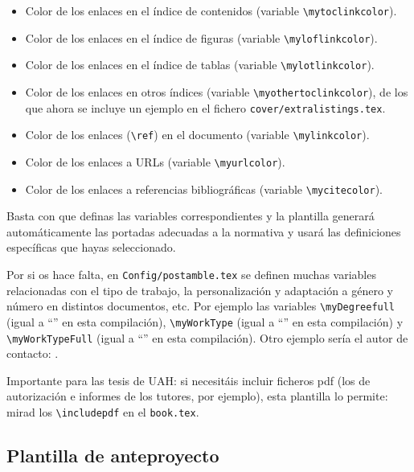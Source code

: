 \begin{itemize}
\item Color de los enlaces en el índice de contenidos (variable
  \texttt{\textbackslash{}mytoclinkcolor}).
\item Color de los enlaces en el índice de figuras (variable
  \texttt{\textbackslash{}myloflinkcolor}).
\item Color de los enlaces en el índice de tablas (variable
  \texttt{\textbackslash{}mylotlinkcolor}).
\item Color de los enlaces en otros índices (variable
  \texttt{\textbackslash{}myothertoclinkcolor}), de los que ahora se
  incluye un ejemplo en el fichero \texttt{cover/extralistings.tex}.
\item Color de los enlaces (\texttt{\textbackslash{}ref}) en el
  documento (variable \texttt{\textbackslash{}mylinkcolor}).
\item Color de los enlaces a URLs (variable
  \texttt{\textbackslash{}myurlcolor}).
\item Color de los enlaces a referencias bibliográficas (variable
  \texttt{\textbackslash{}mycitecolor}).
\end{itemize}

Basta con que definas las variables correspondientes y la plantilla
generará automáticamente las portadas adecuadas a la normativa y usará
las definiciones específicas que hayas seleccionado.

Por si os hace falta, en \texttt{Config/postamble.tex} se definen
muchas variables relacionadas con el tipo de trabajo, la
personalización y adaptación a género y número en distintos
documentos, etc. Por ejemplo las variables
\texttt{\textbackslash{}myDegreefull} (igual a ``\myDegreefull'' en
esta compilación), \texttt{\textbackslash{}myWorkType} (igual a
``\myWorkType'' en esta compilación) y
\texttt{\textbackslash{}myWorkTypeFull} (igual a ``\myWorkTypeFull''
en esta compilación). Otro ejemplo sería el autor de contacto:
\contactauthor.

Importante para las tesis de UAH: si necesitáis incluir ficheros pdf
(los de autorización e informes de los tutores, por ejemplo), esta
plantilla lo permite: mirad los \texttt{\textbackslash{}includepdf} en
el \texttt{book.tex}.

\subsection{Plantilla de anteproyecto}
\label{sec:plantilla-de-anteproyecto}

